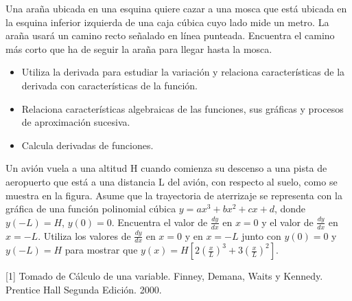 Una araña ubicada en una esquina quiere cazar a una mosca que está ubicada en la esquina inferior izquierda de una caja cúbica cuyo lado mide un metro. La araña usará un camino recto señalado en línea punteada. Encuentra el camino más corto que ha de seguir la araña para llegar hasta la mosca.



\evidencias

\begin{itemize}
  \item Utiliza la derivada para estudiar la variación y relaciona características de la derivada con características de la función.
  \item Relaciona características algebraicas de las funciones, sus gráficas y procesos de aproximación sucesiva.
  \item Calcula derivadas de funciones.
\end{itemize}

\ejemplo

Un avión vuela a una altitud H cuando comienza su descenso a una pista de aeropuerto que está a una distancia L del avión, con respecto al suelo, como se muestra en la figura. Asume que la trayectoria de aterrizaje se representa con la gráfica de una función polinomial cúbica $y=ax^3+bx^2+cx+d$, donde $y(-L)=H$, $y(0)=0$. Encuentra el valor de $\frac{dy}{dx}$ en $x=0$ y el valor de $\frac{dy}{dx}$ en $x=-L$. Utiliza los valores de $\frac{dy}{dx}$ en $x=0$ y en $x=-L$ junto con $y(0)=0$ y $y(-L)=H$ para mostrar que $y(x)=H\left[2\left(\frac{x}{L}\right)^3+3\left(\frac{x}{L}\right)^2\right]$.

[1] Tomado de Cálculo de una variable. Finney, Demana, Waits y Kennedy. Prentice Hall Segunda Edición. 2000.



\evidencias


